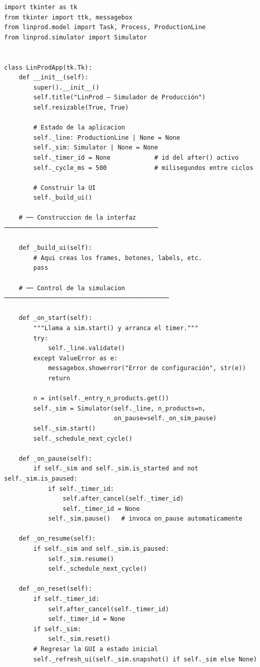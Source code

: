 \documentclass[12pt,letterpaper]{article}
\begin{document}
\begin{lstlisting}
import tkinter as tk
from tkinter import ttk, messagebox
from linprod.model import Task, Process, ProductionLine
from linprod.simulator import Simulator


class LinProdApp(tk.Tk):
    def __init__(self):
        super().__init__()
        self.title("LinProd — Simulador de Producción")
        self.resizable(True, True)

        # Estado de la aplicacion
        self._line: ProductionLine | None = None
        self._sim: Simulator | None = None
        self._timer_id = None            # id del after() activo
        self._cycle_ms = 500             # milisegundos entre ciclos

        # Construir la UI
        self._build_ui()

    # ── Construccion de la interfaz ──────────────────────────────────────────

    def _build_ui(self):
        # Aqui creas los frames, botones, labels, etc.
        pass

    # ── Control de la simulacion ─────────────────────────────────────────────

    def _on_start(self):
        """Llama a sim.start() y arranca el timer."""
        try:
            self._line.validate()
        except ValueError as e:
            messagebox.showerror("Error de configuración", str(e))
            return

        n = int(self._entry_n_products.get())
        self._sim = Simulator(self._line, n_products=n,
                              on_pause=self._on_sim_pause)
        self._sim.start()
        self._schedule_next_cycle()

    def _on_pause(self):
        if self._sim and self._sim.is_started and not self._sim.is_paused:
            if self._timer_id:
                self.after_cancel(self._timer_id)
                self._timer_id = None
            self._sim.pause()   # invoca on_pause automaticamente

    def _on_resume(self):
        if self._sim and self._sim.is_paused:
            self._sim.resume()
            self._schedule_next_cycle()

    def _on_reset(self):
        if self._timer_id:
            self.after_cancel(self._timer_id)
            self._timer_id = None
        if self._sim:
            self._sim.reset()
        # Regresar la GUI a estado inicial
        self._refresh_ui(self._sim.snapshot() if self._sim else None)


\end{lstlisting}
\end{document}
